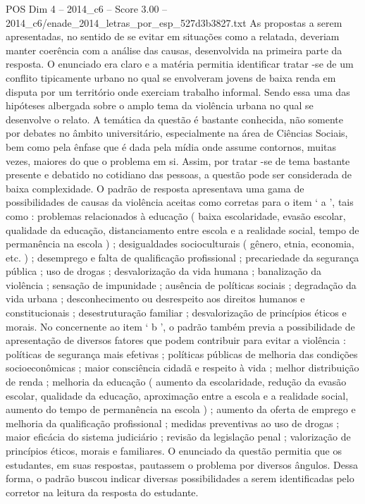 \begin{textsample}{POS Dim 4 – 2014\_c6 – Score 3.00 – 2014\_c6/enade\_2014\_letras\_por\_esp\_527d3b3827.txt}
As propostas a serem apresentadas, no sentido de se evitar em situações como a relatada, deveriam manter coerência com a análise das causas, desenvolvida na primeira parte da resposta.
O enunciado era claro e a matéria permitia identificar tratar -se de um conflito tipicamente urbano no qual se envolveram jovens de baixa renda em disputa por um território onde exerciam trabalho informal.
Sendo essa uma das hipóteses albergada sobre o amplo tema da violência urbana no qual se desenvolve o relato.
A temática da questão é bastante conhecida, não somente por debates no âmbito universitário, especialmente na área de Ciências Sociais, bem como pela ênfase que é dada pela mídia onde assume contornos, muitas vezes, maiores do que o problema em si.
Assim, por tratar -se de tema bastante presente e debatido no cotidiano das pessoas, a questão pode ser considerada de baixa complexidade.
O padrão de resposta apresentava uma gama de possibilidades de causas da violência aceitas como corretas para o item ‘ a ’, tais como : problemas relacionados à educação ( baixa escolaridade, evasão escolar, qualidade da educação, distanciamento entre escola e a realidade social, tempo de permanência na escola ) ; desigualdades socioculturais ( gênero, etnia, economia, etc. ) ; desemprego e falta de qualificação profissional ; precariedade da segurança pública ; uso de drogas ; desvalorização da vida humana ; banalização da violência ; sensação de impunidade ; ausência de políticas sociais ; degradação da vida urbana ; desconhecimento ou desrespeito aos direitos humanos e constitucionais ; desestruturação familiar ; desvalorização de princípios éticos e morais.
No concernente ao item ‘ b ’, o padrão também previa a possibilidade de apresentação de diversos fatores que podem contribuir para evitar a violência : políticas de segurança mais efetivas ; políticas públicas de melhoria das condições socioeconômicas ; maior consciência cidadã e respeito à vida ; melhor distribuição de renda ; melhoria da educação ( aumento da escolaridade, redução da evasão escolar, qualidade da educação, aproximação entre a escola e a realidade social, aumento do tempo de permanência na escola ) ; aumento da oferta de emprego e melhoria da qualificação profissional ; medidas preventivas ao uso de drogas ; maior eficácia do sistema judiciário ; revisão da legislação penal ; valorização de princípios éticos, morais e familiares.
O enunciado da questão permitia que os estudantes, em suas respostas, pautassem o problema por diversos ângulos.
Dessa forma, o padrão buscou indicar diversas possibilidades a serem identificadas pelo corretor na leitura da resposta do estudante.

\end{textsample}
